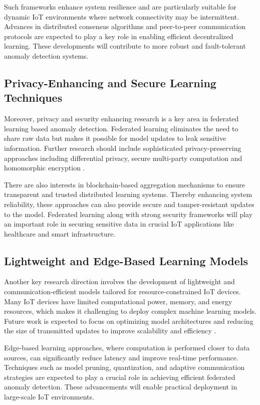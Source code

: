 \documentclass[12pt]{article}
\begin{document}
Such frameworks enhance system resilience and are particularly suitable for dynamic IoT environments where network connectivity may be intermittent. Advances in distributed consensus algorithms and peer-to-peer communication protocols are expected to play a key role in enabling efficient decentralized learning. These developments will contribute to more robust and fault-tolerant anomaly detection systems.

\subsection{Privacy-Enhancing and Secure Learning Techniques}

Moreover, privacy and security enhancing research is a key area in federated learning based anomaly detection. Federated learning eliminates the need to share raw data but makes it possible for model updates to leak sensitive information. Further research should include sophisticated privacy-preserving approaches including differential privacy, secure multi-party computation and homomorphic encryption \cite{paper3,paper4}.

There are also interests in blockchain-based aggregation mechanisms to ensure transparent and trusted distributed learning systems. Thereby enhancing system reliability, these approaches can also provide secure and tamper-resistant updates to the model. Federated learning along with strong security frameworks will play an important role in securing sensitive data in crucial IoT applications like healthcare and smart infrastructure.

\subsection{Lightweight and Edge-Based Learning Models}

Another key research direction involves the development of lightweight and communication-efficient models tailored for resource-constrained IoT devices. Many IoT devices have limited computational power, memory, and energy resources, which makes it challenging to deploy complex machine learning models. Future work is expected to focus on optimizing model architectures and reducing the size of transmitted updates to improve scalability and efficiency \cite{paper5,paper6}.

Edge-based learning approaches, where computation is performed closer to data sources, can significantly reduce latency and improve real-time performance. Techniques such as model pruning, quantization, and adaptive communication strategies are expected to play a crucial role in achieving efficient federated anomaly detection. These advancements will enable practical deployment in large-scale IoT environments.
\end{document}

